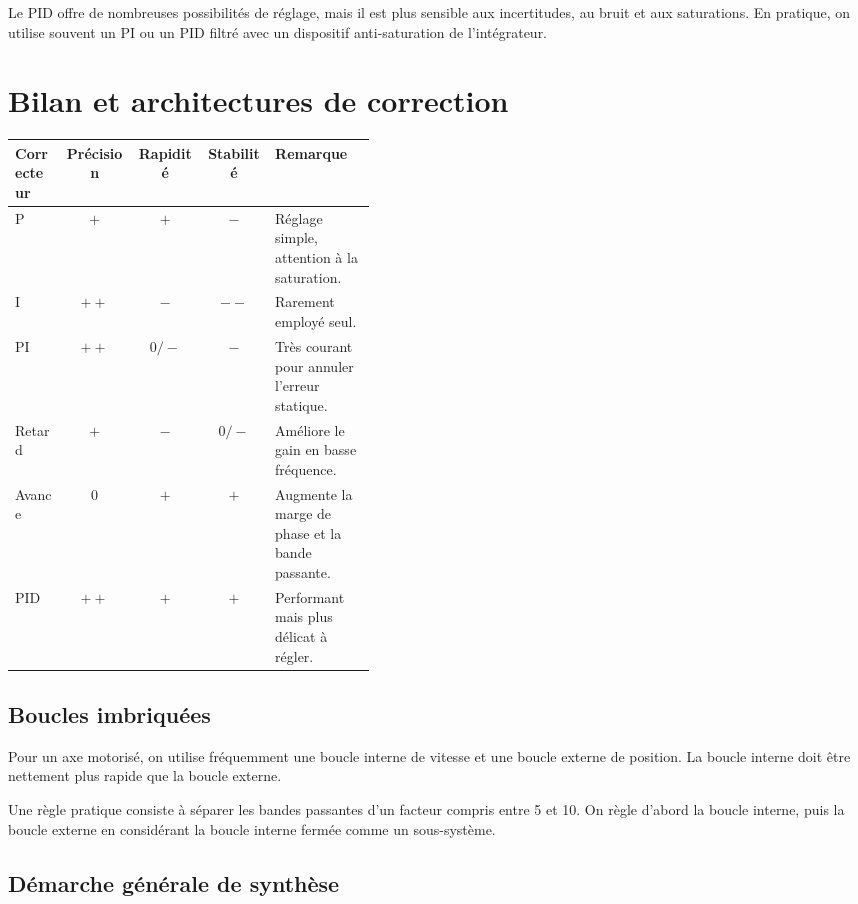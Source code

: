 Le PID offre de nombreuses possibilités de réglage, mais il est plus sensible aux
incertitudes, au bruit et aux saturations. En pratique, on utilise souvent un PI
ou un PID filtré avec un dispositif anti-saturation de l'intégrateur.

\section{Bilan et architectures de correction}\label{sec:corr-bilan}

\begin{center}
\renewcommand{\arraystretch}{1.25}
\begin{tabular}{|p{0.14\linewidth}|c|c|c|p{0.28\linewidth}|}
\hline
\textbf{Correcteur} & \textbf{Précision} & \textbf{Rapidité} & \textbf{Stabilité} & \textbf{Remarque} \\
\hline
P & $+$ & $+$ & $-$ & Réglage simple, attention à la saturation. \\
\hline
I & $++$ & $-$ & $--$ & Rarement employé seul. \\
\hline
PI & $++$ & $0/-$ & $-$ & Très courant pour annuler l'erreur statique. \\
\hline
Retard & $+$ & $-$ & $0/-$ & Améliore le gain en basse fréquence. \\
\hline
Avance & $0$ & $+$ & $+$ & Augmente la marge de phase et la bande passante. \\
\hline
PID & $++$ & $+$ & $+$ & Performant mais plus délicat à régler. \\
\hline
\end{tabular}
\end{center}

\subsection{Boucles imbriquées}

Pour un axe motorisé, on utilise fréquemment une boucle interne de vitesse et une
boucle externe de position. La boucle interne doit être nettement plus rapide que
la boucle externe.

\TLBouclesImbriquees

Une règle pratique consiste à séparer les bandes passantes d'un facteur compris
entre 5 et 10. On règle d'abord la boucle interne, puis la boucle externe en
considérant la boucle interne fermée comme un sous-système.

\subsection{Démarche générale de synthèse}

